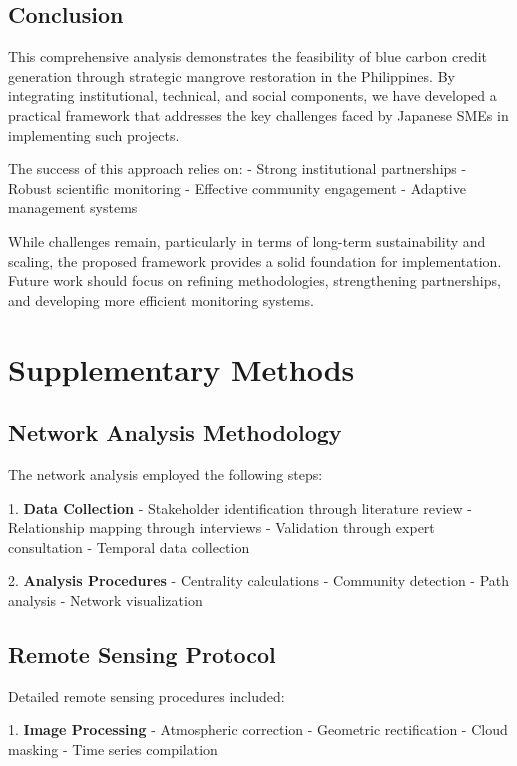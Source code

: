 \documentclass{article}
\theoremstyle{plain}
\theoremstyle{definition}
\theoremstyle{remark}
\begin{document}
\begin{multicols}{2}
\section{Conclusion}

This comprehensive analysis demonstrates the feasibility of blue carbon credit generation through strategic mangrove restoration in the Philippines. By integrating institutional, technical, and social components, we have developed a practical framework that addresses the key challenges faced by Japanese SMEs in implementing such projects.

The success of this approach relies on:
- Strong institutional partnerships
- Robust scientific monitoring
- Effective community engagement
- Adaptive management systems

While challenges remain, particularly in terms of long-term sustainability and scaling, the proposed framework provides a solid foundation for implementation. Future work should focus on refining methodologies, strengthening partnerships, and developing more efficient monitoring systems.

\end{multicols}

\appendix
\section{Supplementary Methods}
\label{appendix:methods}

\subsection{Network Analysis Methodology}

The network analysis employed the following steps:

1. \textbf{Data Collection}
   - Stakeholder identification through literature review
   - Relationship mapping through interviews
   - Validation through expert consultation
   - Temporal data collection

2. \textbf{Analysis Procedures}
   - Centrality calculations
   - Community detection
   - Path analysis
   - Network visualization

\subsection{Remote Sensing Protocol}

Detailed remote sensing procedures included:

1. \textbf{Image Processing}
   - Atmospheric correction
   - Geometric rectification
   - Cloud masking
   - Time series compilation
\end{document}
